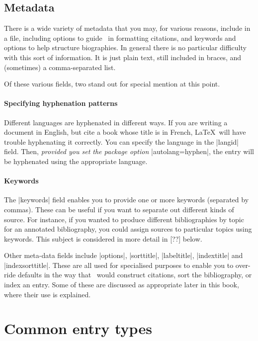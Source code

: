 \subsection{Metadata}

There is a wide variety of metadata that you may, for various reasons,
include in a file, including options to guide \biblatex\ in formatting
citations, and keywords and options to help structure biographies. In
general there is no particular difficulty with this sort of
information. It is just plain text, still included in braces, and
(sometimes) a comma-separated list.

Of these various fields, two stand out for special mention at this
point.

\paragraph{Specifying hyphenation patterns}Different languages are hyphenated in
different ways. If you are writing a document in English, but cite a
book whose title is in French, \LaTeX\ will have trouble hyphenating
it correctly. You can specify the language in the |langid|
field. Then, \emph{provided you set the package option}
|autolang=hyphen|, the entry will be hyphenated using the appropriate
language.

\paragraph{Keywords} The |keywords| field enables you to provide one
or more keywords (separated by commas). These can be useful if you
want to separate out different kinds of source. For instance, if you
wanted to produce different bibliographies by topic for an annotated
bibliography, you could assign sources to particular topics using
keywords. This subject is considered in more detail in [??] below.

Other meta-data fields include |options|, |sorttitle|, |labeltitle|,
|indextitle| and |indexsorttitle|. These are all used for specialised
purposes to enable you to over-ride defaults in the way that
\biblatex\ would construct citations, sort the bibliography, or index
an entry. Some of these are discussed as appropriate later in this
book, where their use is explained.

\section{Common entry types}

